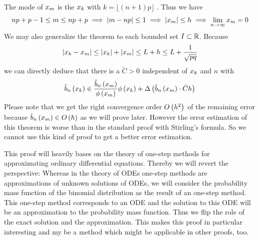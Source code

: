 \begin{remark} \label{remark:alt_local}
  The mode of $\xnp$ is the $\x[k]$ with $k = \lfloor (n+1)p \rfloor$ \cite{nicolas}\cite{wiki:binomial_distribution}. Thus we have
  \begin{align}
    np+p-1 \le \knp \le np+p \implies \abs{\knp-np} \le 1 \implies \abs{\xnp} \le h \implies \lim_{n\to\infty} \xnp = 0
  \end{align}
  We may also generalize the theorem to each bounded set $I \subset \R$. Because
  \begin{align}
    \abs{\x[k]-\xnp} \le \abs{\x[k]}+\abs{\xnp} \le L + h \le L + \frac{1}{\sqrt{pq}}
  \end{align}
  we can directly deduce that there is a $\tilde C > 0$ independent of $\x$ and $n$ with
  \begin{align}
    \bb{\x} \in \frac{\bnp}{\fphi{\xnp}}\fphi{\x} + \bigabs{{\bnp}\cdot \tilde Ch}
  \end{align}
  Please note that we get the right convergence order $\bigo{h^2}$ of the remaining error because $\bnp \in \bigo{h}$ as we will prove later. However the error estimation of this theorem is worse than in the standard proof with Stirling's formula. So we cannot use this kind of proof to get a better error estimation.
\end{remark}

This proof will heavily bases on the theory of one-step methods for approximating ordinary differential equations. Thereby we will revert the perspective: Whereas in the theory of ODEs one-step methods are approximations of unknown solutions of ODEs, we will consider the probability mass function of the binomial distribution as the result of an one-step method. This one-step method corresponds to an ODE and the solution to this ODE will be an approximation to the probability mass function. Thus we flip the role of the exact solution and the approximation. This makes this proof in particular interesting and my be a method which might be applicable in other proofs, too.

